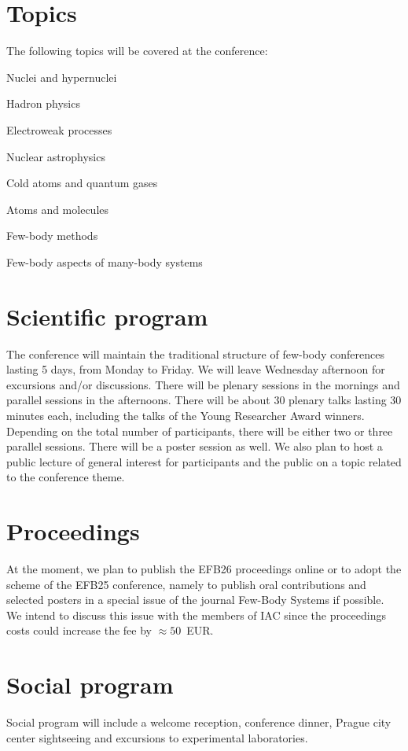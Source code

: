 \documentclass[12pt]{extarticle}
\newcommand*\sq{\mathbin{\vcenter{\hbox{\rule{.8ex}{.8ex}}}}}
\newenvironment{t_sq_itemize}
{\begin{itemize}[topsep=0pt, parsep=0pt, itemsep=0pt, leftmargin=*]
    \renewcommand{\labelitemi}{{\(\sq\)}}}
  {\end{itemize}}
\begin{document}
\section*{Topics}
\noindent
The following topics will be covered at the conference:
\begin{t_sq_itemize}
\item Nuclei and hypernuclei
\item Hadron physics
\item Electroweak processes
\item Nuclear astrophysics
\item Cold atoms and quantum gases
\item Atoms and molecules
\item Few-body methods
\item Few-body aspects of many-body systems
\end{t_sq_itemize}

\section*{Scientific program}
\noindent
The conference will maintain the traditional structure of few-body
conferences lasting 5 days, from Monday to Friday. We will leave
Wednesday afternoon for excursions and/or discussions. There will be
plenary sessions in the mornings and parallel sessions in the
afternoons. There will be about 30 plenary talks lasting 30 minutes
each, including the talks of the Young Researcher Award winners.
Depending on the total number of participants, there will be either
two or three parallel sessions. There will be a poster session as
well. We also plan to host a public lecture of general interest for
participants and the public on a topic related to the conference
theme.

\section*{Proceedings}
\noindent
At the moment, we plan to publish the EFB26 proceedings online or to
adopt the scheme of the EFB25 conference, namely to publish oral
contributions and selected posters in a special issue of the journal
Few-Body Systems if possible. We intend to discuss this issue with the
members of IAC since the proceedings costs could increase the fee by
\(\approx 50\)~EUR.

\section*{Social program}
\noindent
Social program will include a welcome reception, conference dinner,
Prague city center sightseeing and excursions to experimental
laboratories.
\end{document}
